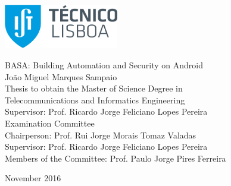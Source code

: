 \thispagestyle {empty}

\includegraphics[width=5.0cm]{Logo.png}

\begin{center}
%
\vspace{0.3cm}
 \vspace{5.0cm}

\vspace{0.8cm}
{\FontLb BASA: Building Automation and Security on Android} \\
\vspace{2.6cm}
{\FontMb João Miguel Marques Sampaio} \\
\vspace{1.9cm}
{\FontSn Thesis to obtain the Master of Science Degree in} \\
\vspace{0.3cm}
{\FontLb Telecommunications and Informatics Engineering} \\
\vspace{1.9cm}
{\FontSn Supervisor: Prof. Ricardo Jorge Feliciano Lopes Pereira} \\
\vspace{1.9cm}
{\FontMb Examination Committee} \\
\vspace{0.3cm}
{\FontSn %
Chairperson:        Prof. Rui Jorge Morais Tomaz Valadas\\
Supervisor:        Prof. Ricardo Jorge Feliciano Lopes Pereira \\
Members of the Committee:  Prof. Paulo Jorge Pires Ferreira \\
}
\vspace{1.5cm}

{\FontMb November 2016} \\
%
\end{center}

\cleardoublepage

\restoregeometry
